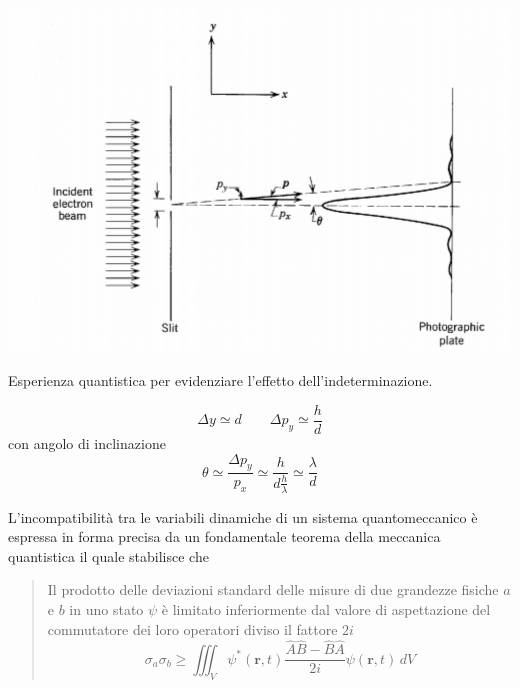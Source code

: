 \begin{marginfigure}
    \includegraphics[width = 1.3 \textwidth, height = 1.3 \textheight]{figs/beam-electron-experiment}
    \caption{Esperienza quantistica per evidenziare l'effetto dell'indeterminazione.}
    \label{fig:beam-electron-experiment}
\end{marginfigure}

\[
    \Delta y \simeq d \qquad \Delta p_{y} \simeq \frac{h}{d}
\] con angolo di inclinazione
\[
    \theta \simeq \frac{\Delta p_{y}}{p_{x}} \simeq \frac{h}{d \frac{h}{\lambda}} \simeq \frac{\lambda}{d}
\]
\bigskip

L'incompatibilità tra le variabili dinamiche di un sistema
quantomeccanico è espressa in forma precisa da un fondamentale teorema
della meccanica quantistica il quale stabilisce che

\begin{quote}
    Il prodotto delle deviazioni standard delle misure di due grandezze
    fisiche \(a\) e \(b\) in uno stato \(\psi\) è limitato inferiormente dal
    valore di aspettazione del commutatore dei loro operatori diviso il
    fattore \(2i\)
    \begin{equation}
        \boxed{\sigma_{a} \sigma_{b} \geq \iiint_{V} \psi^{*}(\bm{r},t) \frac{\hat{A}\hat{B} -\hat{B}\hat{A}}{2i}
        \psi(\bm{r},t) \, dV}
        \label{eq:sigma-product-commutator-theorem}
    \end{equation}
\end{quote}

